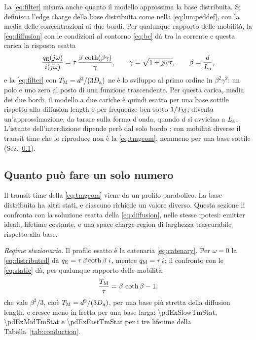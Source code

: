 \documentclass[10pt,a4paper]{scrartcl}
\let\newcommand\pdvaluedefine
\newcommand{\TM}{T_\mathrm{M}}
\newcommand{\qE}{q_\mathrm{E}}
\newcommand{\qM}{q_\mathrm{M}}
\newcommand{\Da}{D_\mathrm{a}}
\newcommand{\La}{L_\mathrm{a}}
\newcommand{\Pp}{p\textsuperscript{+}}
\begin{document}
La \eqref{eq:filter} misura anche quanto il modello approssima la base distribuita. Si definisca l'edge charge della base distribuita come nella \eqref{eq:lumpeddef}, con la media delle concentrazioni ai due bordi. Per qualunque rapporto delle mobilità, la \eqref{eq:diffusion} con le condizioni al contorno \eqref{eq:bc} dà tra la corrente e questa carica la risposta esatta
\begin{equation}
\frac{\qE(j\omega)}{i(j\omega)} = \tau\,\frac{\beta\,\coth(\beta\gamma)}{\gamma} , \qquad \gamma = \sqrt{1+j\omega\tau} , \qquad \beta = \frac{d}{\La} ,
\label{eq:distributed}
\end{equation}
e la \eqref{eq:filter} con $\TM = d^2/(3\Da)$ ne è lo sviluppo al primo ordine in $\beta^2\gamma^2$: un polo e uno zero al posto di una funzione trascendente. Per questa carica, media dei due bordi, il modello a due cariche è quindi esatto per una base sottile rispetto alla diffusion length e per frequenze ben sotto $1/\TM$; diventa un'approssimazione, da tarare sulla forma d'onda, quando $d$ si avvicina a $\La$. L'istante dell'interdizione dipende però dal solo bordo \Pp: con mobilità diverse il transit time che lo riproduce non è la \eqref{eq:tmgeom}, nemmeno per una base sottile (Sez.~\ref{sec:onenumber}).
\subsection{Quanto può fare un solo numero}
\label{sec:onenumber}
Il transit time della \eqref{eq:tmgeom} viene da un profilo parabolico. La base distribuita ha altri stati, e ciascuno richiede un valore diverso. Questa sezione li confronta con la soluzione esatta della \eqref{eq:diffusion}, nelle stesse ipotesi: emitter ideali, lifetime costante, e una space charge region di larghezza trascurabile rispetto alla base.

\emph{Regime stazionario.} Il profilo esatto è la catenaria \eqref{eq:catenary}. Per $\omega = 0$ la \eqref{eq:distributed} dà $\qE = \tau\,\beta\coth\beta\;i$, mentre $\qM = \tau\,i$; il confronto con le \eqref{eq:static} dà, per qualunque rapporto delle mobilità,
\begin{equation}
\frac{\TM}{\tau} = \beta\,\coth\beta - 1 ,
\label{eq:tmstatic}
\end{equation}
che vale $\beta^2/3$, cioè $\TM = d^2/(3\Da)$, per una base più stretta della diffusion length, e cresce meno in fretta per una base larga: \num{\pdExSlowTmStat}, \num{\pdExMidTmStat} e \num{\pdExFastTmStat} per i tre lifetime della Tabella~\ref{tab:conduction}.
\end{document}

